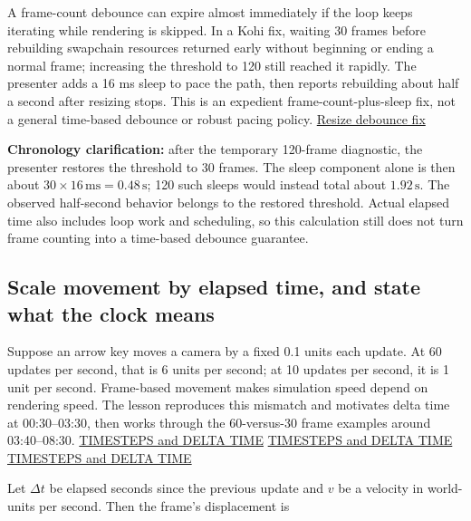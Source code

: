 \hypertarget{05-engine-i-ch014-pace-the-quiet-period-after-a-resize}{}

A frame-count debounce can expire almost immediately if the loop keeps iterating while rendering is skipped. In a Kohi fix, waiting 30 frames before rebuilding swapchain resources returned early without beginning or ending a normal frame; increasing the threshold to 120 still reached it rapidly. The presenter adds a 16 ms sleep to pace the path, then reports rebuilding about half a second after resizing stops. This is an expedient frame-count-plus-sleep fix, not a general time-based debounce or robust pacing policy. \href{https://www.youtube.com/watch?v=x8ao57nbMlY}{Resize debounce fix}

\textbf{Chronology clarification:} after the temporary 120-frame diagnostic, the presenter restores the threshold to 30 frames. The sleep component alone is then about \(30\times16\,\mathrm{ms}=0.48\,\mathrm{s}\); 120 such sleeps would instead total about \(1.92\,\mathrm{s}\). The observed half-second behavior belongs to the restored threshold. Actual elapsed time also includes loop work and scheduling, so this calculation still does not turn frame counting into a time-based debounce guarantee.

\subsection{Scale movement by elapsed time, and state what the clock means}\label{05-engine-i-ch014-scale-movement-by-elapsed-time-and-state-what-the-clock-means}

\hypertarget{05-engine-i-ch014-scale-movement-by-elapsed-time-and-state-what-the-clock-means}{}

Suppose an arrow key moves a camera by a fixed 0.1 units each update. At 60 updates per second, that is 6 units per second; at 10 updates per second, it is 1 unit per second. Frame-based movement makes simulation speed depend on rendering speed. The lesson reproduces this mismatch and motivates delta time at 00:30--03:30, then works through the 60-versus-30 frame examples around 03:40--08:30. \href{https://www.youtube.com/watch?v=pctGOMDW-HQ&t=30s}{TIMESTEPS and DELTA TIME} \href{https://www.youtube.com/watch?v=pctGOMDW-HQ&t=220s}{TIMESTEPS and DELTA TIME} \href{https://www.youtube.com/watch?v=pctGOMDW-HQ&t=500s}{TIMESTEPS and DELTA TIME}

Let \(\Delta t\) be elapsed seconds since the previous update and \(v\) be a velocity in world-units per second. Then the frame's displacement is

